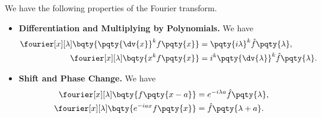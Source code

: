 \begin{proposition}
    We have the following properties of the Fourier transform.

    \begin{itemize}
        \item \textbf{Differentiation and Multiplying by Polynomials.} We have
        \begin{subequations}
            \label{eq:fourier-diff-poly}%
            \begin{align}
                \fourier[x][\lambda] \bqty{\pqty{\dv{x}}^k f\pqty{x}} &= \pqty{i \lambda}^k \hat{f}\pqty{\lambda}, \label{eq:fourier-diff}\\
                \fourier[x][\lambda] \bqty{x^k f\pqty{x}} &= i^k \pqty{\dv{\lambda}}^k \hat{f}\pqty{\lambda}. \label{eq:fourier-poly}
            \end{align}
        \end{subequations}
    
        \item \textbf{Shift and Phase Change.} We have
        \begin{subequations}
            \label{eq:fourier-shift-phase}%
            \begin{align}
                \fourier[x][\lambda] \bqty{f\pqty{x - a}} &= e^{-i \lambda a} \hat{f}\pqty{\lambda}, \\
                \fourier[x][\lambda] \bqty{e^{- i a x} f\pqty{x}} &= \hat{f}\pqty{\lambda + a}.
            \end{align}
        \end{subequations}
    \end{itemize}
\end{proposition}


